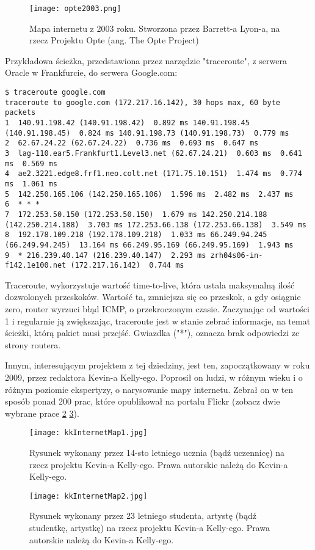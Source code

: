 \documentclass[a4paper, 12pt]{article}
\begin{document}
\begin{figure}[H]
	\center
	\texttt{[image: opte2003.png]}
	\caption{Mapa internetu z 2003 roku. Stworzona przez Barrett-a Lyon-a, na rzecz Projektu Opte (ang. The Opte Project)\cite{lyonInternet}}
	\label{fig:opte2003}
\end{figure}

Przykładowa ścieżka, przedstawiona przez narzędzie "traceroute", z serwera Oracle w Frankfurcie, do serwera Google.com:
\begin{lstlisting}
$ traceroute google.com
traceroute to google.com (172.217.16.142), 30 hops max, 60 byte packets
1  140.91.198.42 (140.91.198.42)  0.892 ms 140.91.198.45 (140.91.198.45)  0.824 ms 140.91.198.73 (140.91.198.73)  0.779 ms
2  62.67.24.22 (62.67.24.22)  0.736 ms  0.693 ms  0.647 ms
3  lag-110.ear5.Frankfurt1.Level3.net (62.67.24.21)  0.603 ms  0.641 ms  0.569 ms
4  ae2.3221.edge8.frf1.neo.colt.net (171.75.10.151)  1.474 ms  0.774 ms  1.061 ms
5  142.250.165.106 (142.250.165.106)  1.596 ms  2.482 ms  2.437 ms
6  * * *
7  172.253.50.150 (172.253.50.150)  1.679 ms 142.250.214.188 (142.250.214.188)  3.703 ms 172.253.66.138 (172.253.66.138)  3.549 ms
8  192.178.109.218 (192.178.109.218)  1.033 ms 66.249.94.245 (66.249.94.245)  13.164 ms 66.249.95.169 (66.249.95.169)  1.943 ms
9  * 216.239.40.147 (216.239.40.147)  2.293 ms zrh04s06-in-f142.1e100.net (172.217.16.142)  0.744 ms
\end{lstlisting}
Traceroute, wykorzystuje wartość time-to-live, która ustala maksymalną ilość dozwolonych przeskoków. Wartość ta, zmniejsza się co przeskok, a gdy osiągnie zero, router wyrzuci błąd ICMP, o przekroczonym czasie. Zaczynając od wartości 1 i regularnie ją zwiększając, traceroute jest w stanie zebrać informacje, na temat ścieżki, którą pakiet musi przejść. Gwiazdka ("*"), oznacza brak odpowiedzi ze strony routera.

Innym, interesującym projektem z tej dziedziny, jest ten, zapoczątkowany w roku 2009, przez redaktora Kevin-a Kelly-ego. Poprosił on ludzi, w różnym wieku i o różnym poziomie ekspertyzy, o narysowanie mapy internetu. Zebrał on w ten sposób ponad 200 prac, które opublikował na portalu Flickr (zobacz dwie wybrane prace \ref{fig:kkimp1} \ref{fig:kkimp2}).\cite{popovaInternetChaos}\cite{kellyInternetMappingProject}

\begin{figure}[H]
	\center
	\texttt{[image: kkInternetMap1.jpg]}
	\caption{Rysunek wykonany przez 14-sto letniego ucznia (bądź uczennicę) na rzecz projektu Kevin-a Kelly-ego. Prawa autorskie należą do Kevin-a Kelly-ego.\cite{kellyInternetMap1}}
	\label{fig:kkimp1}
\end{figure}
\begin{figure}[H]
	\center
	\texttt{[image: kkInternetMap2.jpg]}
	\caption{Rysunek wykonany przez 23 letniego studenta, artystę (bądź studentkę, artystkę) na rzecz projektu Kevin-a Kelly-ego. Prawa autorskie należą do Kevin-a Kelly-ego.\cite{kellyInternetMap2}}
	\label{fig:kkimp2}
\end{figure}
\end{document}
